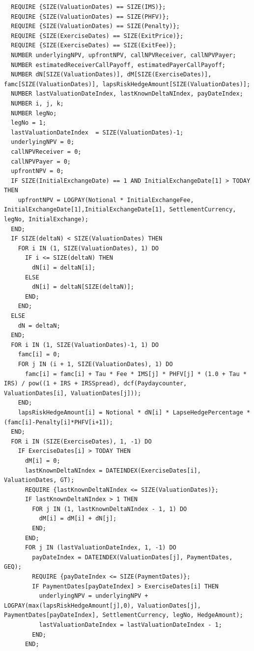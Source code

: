 \begin{listing}[hbt]
\begin{verbatim}
  REQUIRE {SIZE(ValuationDates) == SIZE(IMS)};
  REQUIRE {SIZE(ValuationDates) == SIZE(PHFV)};
  REQUIRE {SIZE(ValuationDates) == SIZE(Penalty)};
  REQUIRE {SIZE(ExerciseDates) == SIZE(ExitPrice)};
  REQUIRE {SIZE(ExerciseDates) == SIZE(ExitFee)};
  NUMBER underlyingNPV, upfrontNPV, callNPVReceiver, callNPVPayer;
  NUMBER estimatedReceiverCallPayoff, estimatedPayerCallPayoff;
  NUMBER dN[SIZE(ValuationDates)], dM[SIZE(ExerciseDates)], famc[SIZE(ValuationDates)], lapsRiskHedgeAmount[SIZE(ValuationDates)];
  NUMBER lastValuationDateIndex, lastKnownDeltaNIndex, payDateIndex;
  NUMBER i, j, k;
  NUMBER legNo;
  legNo = 1;
  lastValuationDateIndex  = SIZE(ValuationDates)-1;
  underlyingNPV = 0;
  callNPVReceiver = 0;
  callNPVPayer = 0;
  upfrontNPV = 0;
  IF SIZE(InitialExchangeDate) == 1 AND InitialExchangeDate[1] > TODAY THEN
    upfrontNPV = LOGPAY(Notional * InitialExchangeFee, InitialExchangeDate[1],InitialExchangeDate[1], SettlementCurrency, legNo, InitialExchange);
  END;
  IF SIZE(deltaN) < SIZE(ValuationDates) THEN
    FOR i IN (1, SIZE(ValuationDates), 1) DO
      IF i <= SIZE(deltaN) THEN
        dN[i] = deltaN[i];
      ELSE
        dN[i] = deltaN[SIZE(deltaN)];
      END;
    END;
  ELSE
    dN = deltaN;
  END;
  FOR i IN (1, SIZE(ValuationDates)-1, 1) DO
    famc[i] = 0;
    FOR j IN (i + 1, SIZE(ValuationDates), 1) DO
      famc[i] = famc[i] + Tau * Fee * IMS[j] * PHFV[j] * (1.0 + Tau * IRS) / pow((1 + IRS + IRSSpread), dcf(Paydaycounter, ValuationDates[i], ValuationDates[j]));
    END;
    lapsRiskHedgeAmount[i] = Notional * dN[i] * LapseHedgePercentage * (famc[i]-Penalty[i]*PHFV[i+1]);
  END;
  FOR i IN (SIZE(ExerciseDates), 1, -1) DO
    IF ExerciseDates[i] > TODAY THEN
      dM[i] = 0;
      lastKnownDeltaNIndex = DATEINDEX(ExerciseDates[i], ValuationDates, GT);
      REQUIRE {lastKnownDeltaNIndex <= SIZE(ValuationDates)};
      IF lastKnownDeltaNIndex > 1 THEN
        FOR j IN (1, lastKnownDeltaNIndex - 1, 1) DO
          dM[i] = dM[i] + dN[j];
        END;
      END;
      FOR j IN (lastValuationDateIndex, 1, -1) DO
        payDateIndex = DATEINDEX(ValuationDates[j], PaymentDates, GEQ);
        REQUIRE {payDateIndex <= SIZE(PaymentDates)};
        IF PaymentDates[payDateIndex] > ExerciseDates[i] THEN
          underlyingNPV = underlyingNPV + LOGPAY(max(lapsRiskHedgeAmount[j],0), ValuationDates[j], PaymentDates[payDateIndex], SettlementCurrency, legNo, HedgeAmount);
          lastValuationDateIndex = lastValuationDateIndex - 1;
        END;
      END;


\end{verbatim}
\end{listing}
